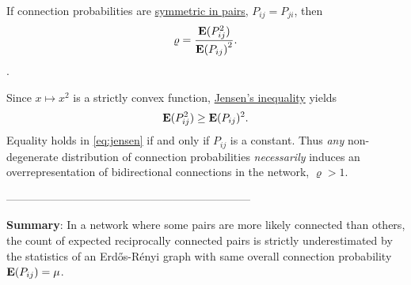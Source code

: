 If connection probabilities are \underline{symmetric in pairs}, $P_{ij} = P_{ji}$, then
\begin{align}
\varrho = \frac{\E(P_{ij}^2)}{{\E\left(P_{ij}\right)}^2}.
\end{align}.

Since $x \mapsto x^2$ is a strictly convex function, \underline{Jensen's inequality} \cite{Jensen1906} yields
\begin{align}
\operatorname{\mathbf{E}}(P_{ij}^2) \geq \operatorname{\mathbf{E}}(P_{ij})^2. \label{eq:jensen}
\end{align}
Equality holds in \eqref{eq:jensen} if and only if $P_{ij}$ is a constant. Thus \textit{any} non-degenerate distribution of connection probabilities \textit{necessarily} induces an overrepresentation of bidirectional connections in the network, $\varrho > 1$.

\begin{center}
  ------------------------------------------------------------------
\end{center}

\textcolor{gblue}{\textbf{Summary}}: In a network where some pairs are more likely connected than others, the count of expected reciprocally connected pairs is strictly underestimated by the statistics of an Erd\H{o}s-R\'{e}nyi graph with same overall connection probability $\operatorname{\mathbf{E}}(P_{ij}) = \mu$.

